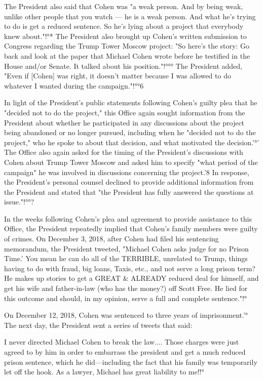The President also said that Cohen was "a weak person.
And by being weak, unlike other people that you watch — he is a weak person.
And what he's trying to do is get a reduced sentence.
So he's lying about a project that everybody knew about."!°*
The President also brought up Cohen's written submission to Congress regarding the Trump Tower Moscow project:
"So here's the story: Go back and look at the paper that Michael Cohen wrote before he testified in the House and/or Senate.
It talked about his position."!°°°
The President added, "Even if [Cohen] was right, it doesn't matter because I was allowed to do whatever I wanted during the campaign."!°°6

In light of the President's public statements following Cohen's guilty plea that he "decided not to do the project," this Office again sought information from the President about whether he participated in any discussions about the project being abandoned or no longer pursued, including when he "decided not to do the project," who he spoke to about that decision, and what motivated the decision.'°'
The Office also again asked for the timing of the President's discussions with Cohen about Trump Tower Moscow and asked him to specify "what period of the campaign" he was involved in discussions concerning the project.'8
In response, the President's personal counsel declined to provide additional information from the President and stated that "the President has fully answered the questions at issue."!°°?

In the weeks following Cohen's plea and agreement to provide assistance to this Office, the President repeatedly implied that Cohen's family members were guilty of crimes.
On December 3, 2018, after Cohen had filed his sentencing memorandum, the President tweeted, "Michael Cohen asks judge for no Prison Time.'
You mean he can do all of the TERRIBLE, unrelated to Trump, things having to do with fraud, big loans, Taxis, etc., and not serve a long prison term?
He makes up stories to get a GREAT \& ALREADY reduced deal for himself, and get his wife and father-in-law (who has the money?) off Scott Free.
He lied for this outcome and should, in my opinion, serve a full and complete sentence."!°

On December 12, 2018, Cohen was sentenced to three years of imprisonment.'°
The next day, the President sent a series of tweets that said:

I never directed Michael Cohen to break the law....
Those charges were just agreed to by him in order to embarrass the president and get a much reduced prison sentence, which he did—including the fact that his family was temporarily let off the hook.
As a lawyer, Michael has great liability to me!!°

